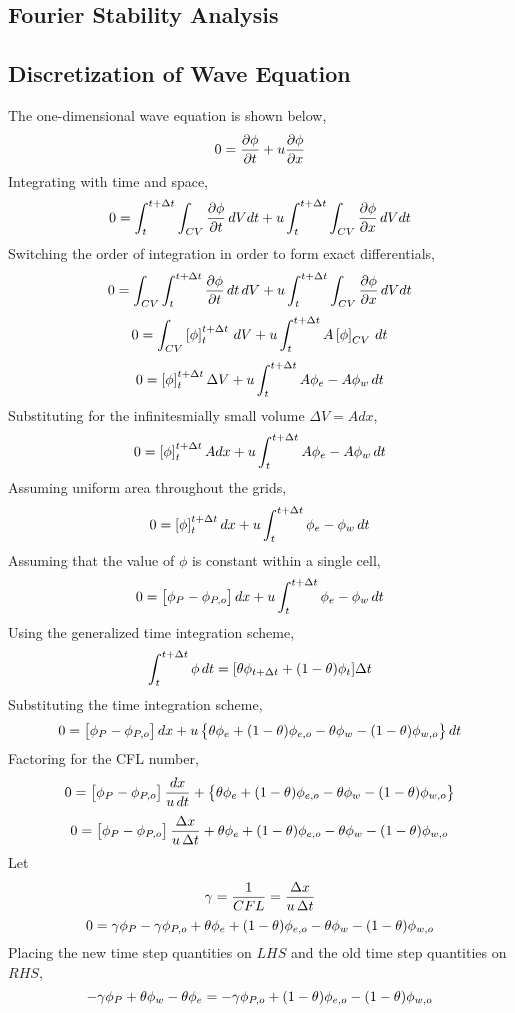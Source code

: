 \documentclass[a4paper, 12pt]{report}
\begin{document}
\begin{center}
\section{Fourier Stability Analysis}
\begin{comment}
\end{comment}
\subsection{Discretization of Wave Equation}
\begin{comment}
\end{comment}
The one-dimensional wave equation is shown below,
$$0 = \frac{\partial\phi}{\partial t} + u\frac{\partial\phi}{\partial x}$$
Integrating with time and space,
$$0 = \int^{t+\Delta t}_{t}\int_{CV} \frac{\partial\phi}{\partial t} \,dVdt + u\int^{t+\Delta t}_{t}\int_{CV}\frac{\partial\phi}{\partial x}\,dVdt$$
Switching the order of integration in order to form exact differentials,
$$0 = \int_{CV}\int^{t+\Delta t}_{t} \frac{\partial\phi}{\partial t} \,dt\,dV + u\int^{t+\Delta t}_{t}\int_{CV}\frac{\partial\phi}{\partial x}\,dVdt$$
$$0 = \int_{CV}\left[\phi\right]^{t+\Delta t}_{t} \,dV + u\int^{t+\Delta t}_{t}A\left[\phi\right]_{CV}\,dt$$
$$0 = \left[\phi\right]^{t+\Delta t}_{t}\Delta V  + u\int^{t+\Delta t}_{t}A\phi_{e} - A\phi_{w}\,dt$$
Substituting for the infinitesmially small volume $\Delta V = A dx$,
$$0 = \left[\phi\right]^{t+\Delta t}_{t}A dx  + u\int^{t+\Delta t}_{t}A\phi_{e} - A\phi_{w}\,dt$$
Assuming uniform area throughout the grids,
$$0 = \left[\phi\right]^{t+\Delta t}_{t} dx  + u\int^{t+\Delta t}_{t}\phi_{e} - \phi_{w}\,dt$$
Assuming that the value of $\phi$ is constant within a single cell,
$$0 = \left[\phi_{P} - \phi_{P,o}\right] dx  + u\int^{t+\Delta t}_{t}\phi_{e} - \phi_{w}\,dt$$
Using the generalized time integration scheme,
$$\int^{t+\Delta t}_{t} \phi\,dt = [\theta\phi_{t+\Delta t} + (1-\theta)\phi_{t}]\Delta t$$
Substituting the time integration scheme,
$$0 = \left[\phi_{P} - \phi_{P,o}\right] dx  + u\left\{\theta\phi_{e} + (1-\theta)\phi_{e,o} - \theta\phi_{w} - (1-\theta)\phi_{w,o}\right\}dt$$
Factoring for the CFL number,
$$0 = \left[\phi_{P} - \phi_{P,o}\right] \frac{dx}{u\,dt}  + \left\{\theta\phi_{e} + (1-\theta)\phi_{e,o} - \theta\phi_{w} - (1-\theta)\phi_{w,o}\right\}$$
$$0 = \left[\phi_{P} - \phi_{P,o}\right] \frac{\Delta x}{u\,\Delta t}  + \theta\phi_{e} + (1-\theta)\phi_{e,o} - \theta\phi_{w} - (1-\theta)\phi_{w,o}$$
Let 
$$\gamma = \frac{1}{CFL} = \frac{\Delta x}{u\,\Delta t}$$
$$0 = \gamma\phi_{P} - \gamma\phi_{P,o}   + \theta\phi_{e} + (1-\theta)\phi_{e,o} - \theta\phi_{w} - (1-\theta)\phi_{w,o}$$
Placing the new time step quantities on $LHS$ and the old time step quantities on $RHS$,
$$-\gamma\phi_{P} + \theta\phi_{w} - \theta\phi_{e} = - \gamma\phi_{P,o} + (1-\theta)\phi_{e,o} - (1-\theta)\phi_{w,o}$$

\end{center}
\end{document}
